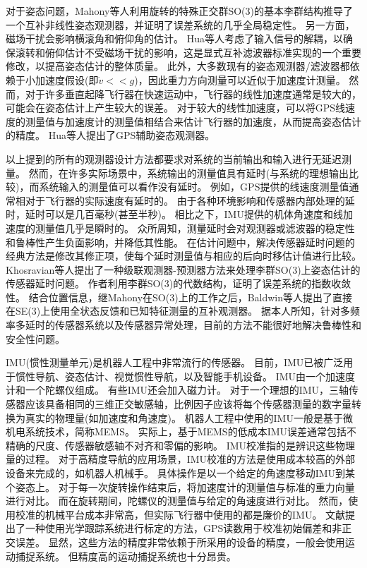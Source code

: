 \documentclass[
  type=master
]{gdutthesis}
\begin{document}
对于姿态问题，Mahony等人利用旋转的特殊正交群SO(3)的基本李群结构推导了一个互补非线性姿态观测器，并证明了误差系统的几乎全局稳定性\cite{mahony2008nonlinear}。
另一方面，磁场干扰会影响横滚角和俯仰角的估计。
Hua等人考虑了输入信号的解耦，以确保滚转和俯仰估计不受磁场干扰的影响，这是显式互补滤波器标准实现的一个重要修改，以提高姿态估计的整体质量\cite{hua2011nonlinear}。
此外，大多数现有的姿态观测器/滤波器都依赖于小加速度假设(即$\dot{v}<<g$)，因此重力方向测量可以近似于加速度计测量。
然而，对于许多垂直起降飞行器在快速运动中，飞行器的线性加速度通常是较大的，可能会在姿态估计上产生较大的误差。
对于较大的线性加速度，可以将GPS线速度的测量值与加速度计的测量值相结合来估计飞行器的加速度，从而提高姿态估计的精度。
Hua等人提出了GPS辅助姿态观测器\cite{hua2010attitude}。

以上提到的所有的观测器设计方法都要求对系统的当前输出和输入进行无延迟测量。
然而，在许多实际场景中，系统输出的测量值具有延时(与系统的理想输出比较)，而系统输入的测量值可以看作没有延时。
例如，GPS提供的线速度测量值通常相对于飞行器的实际速度有延时的。
由于各种环境影响和传感器内部处理的延时，延时可以是几百毫秒(甚至半秒)\cite{kingston2004real}。
相比之下，IMU提供的机体角速度和线加速度的测量值几乎是瞬时的。
众所周知，测量延时会对观测器或滤波器的稳定性和鲁棒性产生负面影响，并降低其性能\cite{battilotti2015nonlinear}。
在估计问题中，解决传感器延时问题的经典方法是修改其修正项，使每个延时测量值与相应的后向时移估计值进行比较。
Khosravian等人提出了一种级联观测器-预测器方法来处理李群SO(3)上姿态估计的传感器延时问题\cite{khosravian2016state}。
作者利用李群SO(3)的代数结构，证明了误差系统的指数收敛性。
结合位置信息，继Mahony在SO(3)上的工作之后，Baldwin等人提出了直接在SE(3)上使用全状态反馈和已知特征测量的互补观测器\cite{baldwin2007complementary}。
据本人所知，针对多频率多延时的传感器系统以及传感器异常处理，目前的方法不能很好地解决鲁棒性和安全性问题。

IMU(惯性测量单元)是机器人工程中非常流行的传感器。
目前，IMU已被广泛用于惯性导航、姿态估计、视觉惯性导航，以及智能手机设备\cite{jekeli2012inertial,li2013real}。
IMU由一个加速度计和一个陀螺仪组成。
有些IMU还会加入磁力计。
对于一个理想的IMU，三轴传感器应该具备相同的三维正交敏感轴，比例因子应该将每个传感器测量的数字量转换为真实的物理量(如加速度和角速度)。
机器人工程中使用的IMU一般是基于微机电系统技术，简称MEMS。
实际上，基于MEMS的低成本IMU误差通常包括不精确的尺度、传感器敏感轴不对齐和零偏的影响。
IMU校准指的是辨识这些物理量的过程。
对于高精度导航的应用场景，IMU校准的方法是使用成本较高的外部设备来完成的，如机器人机械手。
具体操作是以一个给定的角速度移动IMU到某个姿态上\cite{hall2000case}。
对于每一次旋转操作结束后，将加速度计的测量值与标准的重力向量进行对比。
而在旋转期间，陀螺仪的测量值与给定的角速度进行对比。
然而，使用校准的机械平台成本非常高，但实际飞行器中使用的都是廉价的IMU。
文献\parencite{kim2004initial}提出了一种使用光学跟踪系统进行标定的方法，GPS读数用于校准初始偏差和非正交误差。
显然，这些方法的精度非常依赖于所采用的设备的精度，一般会使用运动捕捉系统。
但精度高的运动捕捉系统也十分昂贵。
\end{document}
